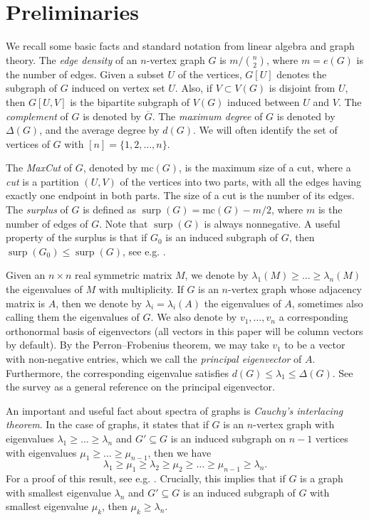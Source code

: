 \documentclass[11pt]{article}
\theoremstyle{plain}
\theoremstyle{definition}
\DeclareMathOperator{\surp}{surp}
\begin{document}
\section{Preliminaries}\label{sect:prelim}

We recall some basic facts and standard notation from linear algebra and graph theory. The \emph{edge density} of an $n$-vertex graph $G$ is $m/\binom{n}{2}$, where $m=e(G)$ is the number of edges. Given a subset $U$ of the vertices, $G[U]$ denotes the subgraph of $G$ induced on vertex set $U$. Also, if $V\subset V(G)$ is disjoint from $U$, then $G[U,V]$ is the bipartite subgraph of $V(G)$ induced between $U$ and $V$. The \emph{complement} of $G$ is denoted by $\overline{G}$. The \emph{maximum degree} of $G$ is denoted by $\Delta(G)$, and the average degree by $d(G)$. We will often identify the set of vertices of $G$ with $[n]=\{1,2,\dots,n\}$.

The \emph{MaxCut} of $G$, denoted by $\mbox{mc}(G)$, is the maximum size of a cut, where a \emph{cut} is a partition $(U,V)$ of the vertices into two parts, with all the edges having exactly one endpoint in both parts. The size of a cut is the number of its edges. The \emph{surplus} of $G$ is defined as $\surp(G)=\mbox{mc}(G)-m/2$, where $m$ is the number of edges of $G$. Note that $\surp(G)$ is always nonnegative. A useful property of the surplus is that if $G_0$ is an induced subgraph of $G$, then $\surp(G_0)\leq \surp(G)$, see e.g. \cite{GJS}.

Given an $n\times n$ real symmetric matrix $M$, we denote by $\lambda_1(M)\geq\dots\geq \lambda_n(M)$ the eigenvalues of $M$ with multiplicity. 
If $G$ is an $n$-vertex graph whose adjacency matrix is $A$, then we denote by $\lambda_i=\lambda_i(A)$ the eigenvalues of $A$, sometimes also calling them the eigenvalues of $G$.
We also denote by $v_1, \dots, v_n$ a corresponding orthonormal basis of eigenvectors (all vectors in this paper will be column vectors by default).
By the Perron--Frobenius theorem, we may take $v_1$ to be a vector with non-negative entries, which we call the \emph{principal eigenvector} of $A$. Furthermore, the corresponding eigenvalue satisfies $d(G)\leq \lambda_1\leq \Delta(G)$. See the survey \cite{eigenvalue_survey} as a general reference on the principal eigenvector.

An important and useful fact about spectra of graphs is \textit{Cauchy's interlacing theorem}.
In the case of graphs, it states that if $G$ is an $n$-vertex graph with eigenvalues $\lambda_1\geq \dots\geq \lambda_n$ and $G'\subseteq  G$ is an induced subgraph on $n-1$ vertices with eigenvalues $\mu_1\geq  \dots \geq \mu_{n-1}$, then we have \[\lambda_1\geq \mu_1\geq \lambda_2\geq \mu_2\geq \dots\geq \mu_{n-1}\geq \lambda_n.\]
For a proof of this result, see e.g. \cite{fisk04}. Crucially, this implies that if $G$ is a graph with smallest eigenvalue $\lambda_n$ and $G'\subseteq G$ is an induced subgraph of $G$ with smallest eigenvalue $\mu_k$, then $\mu_k\geq \lambda_n$.
\end{document}
